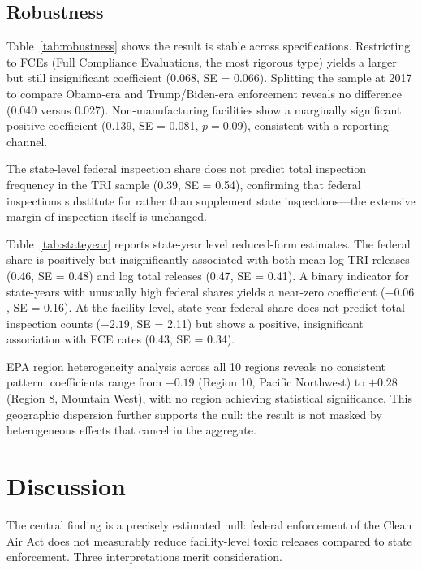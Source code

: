\documentclass[12pt]{article}
\begin{document}
\subsection{Robustness}



Table~\ref{tab:robustness} shows the result is stable across specifications. Restricting to FCEs (Full Compliance Evaluations, the most rigorous type) yields a larger but still insignificant coefficient (0.068, SE = 0.066). Splitting the sample at 2017 to compare Obama-era and Trump/Biden-era enforcement reveals no difference (0.040 versus 0.027). Non-manufacturing facilities show a marginally significant positive coefficient (0.139, SE = 0.081, $p = 0.09$), consistent with a reporting channel.

The state-level federal inspection share does not predict total inspection frequency in the TRI sample (0.39, SE = 0.54), confirming that federal inspections substitute for rather than supplement state inspections---the extensive margin of inspection itself is unchanged.



Table~\ref{tab:stateyear} reports state-year level reduced-form estimates. The federal share is positively but insignificantly associated with both mean log TRI releases (0.46, SE = 0.48) and log total releases (0.47, SE = 0.41). A binary indicator for state-years with unusually high federal shares yields a near-zero coefficient ($-0.06$, SE = 0.16). At the facility level, state-year federal share does not predict total inspection counts ($-2.19$, SE = 2.11) but shows a positive, insignificant association with FCE rates (0.43, SE = 0.34).

EPA region heterogeneity analysis across all 10 regions reveals no consistent pattern: coefficients range from $-0.19$ (Region 10, Pacific Northwest) to $+0.28$ (Region 8, Mountain West), with no region achieving statistical significance. This geographic dispersion further supports the null: the result is not masked by heterogeneous effects that cancel in the aggregate.


\section{Discussion}

The central finding is a precisely estimated null: federal enforcement of the Clean Air Act does not measurably reduce facility-level toxic releases compared to state enforcement. Three interpretations merit consideration.
\end{document}
